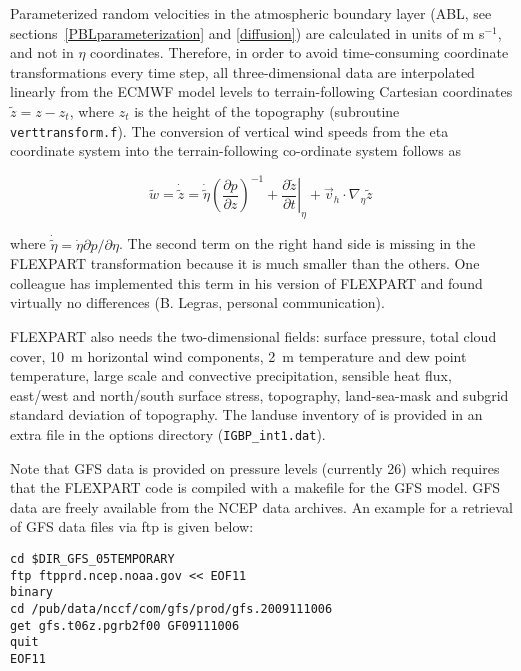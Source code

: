 \documentclass{egu}                  %
\begin{document}
Parameterized random velocities in the atmospheric boundary layer (ABL, see
sections~\ref{PBLparameterization} and \ref{diffusion}) are calculated in units
of m s$^{-1}$, and not in $\eta$ coordinates.  Therefore, in order to avoid
time-consuming coordinate transformations every time step, all
three-dimensional data are interpolated linearly from the ECMWF model levels to
terrain-following Cartesian coordinates $\tilde{z}=z-z_t$, where $z_t$ is the
height of the topography (subroutine \verb|verttransform.f|).  The conversion
of vertical wind speeds from the eta coordinate system into the
terrain-following co-ordinate system follows as

\begin{equation}
\tilde{w}=\dot{\tilde{z}}=\dot{\tilde{\eta}} \left( \frac{\partial p}{\partial z} \right)^{-1} + \left.\frac{\partial \tilde{z}}{\partial t}\right|_\eta +  \vec{v}_h \cdot \nabla_\eta \tilde{z}  \,
\end{equation}

where $\dot{\tilde{\eta}}=\dot{\eta} \partial p / \partial \eta$.  The second
term on the right hand side is missing in the FLEXPART transformation because
it is much smaller than the others.  One colleague has implemented this term in
his version of FLEXPART and found virtually no differences (B.  Legras,
personal communication).

FLEXPART also needs the two-dimensional fields: surface pressure, total cloud
cover, 10~m horizontal wind components, 2~m temperature and dew point
temperature, large scale and convective precipitation, sensible heat flux,
east/west and north/south surface stress, topography, land-sea-mask and subgrid
standard deviation of topography.  The landuse inventory of \citet{belward1999}
is provided in an extra file in the options directory (\verb|IGBP_int1.dat|).

Note that GFS data is provided on pressure levels (currently 26) which requires
that the FLEXPART code is compiled with a makefile for the GFS model. GFS data
are freely available from the NCEP data archives. An example for a retrieval
of GFS data files via ftp is given below:

\begin{small}
\begin{verbatim}
cd $DIR_GFS_05TEMPORARY
ftp ftpprd.ncep.noaa.gov << EOF11
binary
cd /pub/data/nccf/com/gfs/prod/gfs.2009111006
get gfs.t06z.pgrb2f00 GF09111006
quit
EOF11
\end{verbatim}
\end{small}
\end{document}
